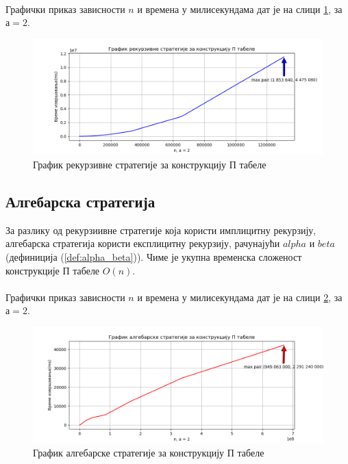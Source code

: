 \documentclass[a4paper]{article}
\begin{document}


\leavevmode\\
Графички приказ зависности $ n $ и времена у милисекундама дат је на слици \ref{fig:recursive}, за $ а = 2 $.

\begin{figure}[H]
	\caption{График рекурзивне стратегије за конструкцију П табеле}
	\label{fig:recursive}
	\begin{center}
		\includegraphics[width=\textwidth]{recursive.png}
	\end{center}
\end{figure}

\subsection{Алгебарска стратегија}

За разлику од рекурзиивне стратегије која користи имплицитну рекурзију, алгебарска стратегија користи експлицитну рекурзију, рачунајући $ alpha $ и $ beta $ (дефиниција (\ref{def:alpha_beta})). Чиме је укупна временска сложеност конструкције П табеле $ O(n) $.\\



\leavevmode\\
Графички приказ зависности $ n $ и времена у милисекундама дат је на слици \ref{fig:algebraic}, за $ а = 2 $.

\begin{figure}[H]
	\caption{График алгебарске стратегије за конструкцију П табеле}
	\label{fig:algebraic}
	\begin{center}
		\includegraphics[width=\textwidth]{algebraic.png}
	\end{center}
\end{figure}
\end{document}
